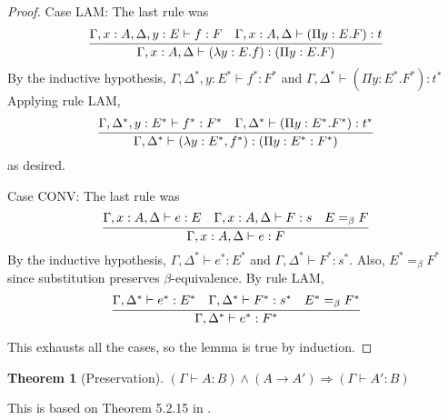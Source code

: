 \documentclass{article}
\newtheorem{theorem}{Theorem}
\begin{document}
\begin{proof}
  Case LAM: The last rule was
  \[\infer{\Gamma,x:A,\Delta\vdash(\lambda y:E.f):(\Pi y:E.F)}{\Gamma,x:A,\Delta,y:E\vdash f:F & \Gamma,x:A,\Delta\vdash(\Pi y:E.F):t}\]
  By the inductive hypothesis, $\Gamma,\Delta^*,y:E^*\vdash f^*:F^*$ and $\Gamma,\Delta^*\vdash(\Pi y:E^*.F^*):t^*$
  Applying rule LAM,
  \[\infer{\Gamma,\Delta^*\vdash(\lambda y:E^*,f^*):(\Pi y:E^*:F^*)}{\Gamma,\Delta^*,y:E^*\vdash f^*:F^* & \Gamma,\Delta^*\vdash(\Pi y:E^*.F^*):t^*}\]
  as desired.

  Case CONV: The last rule was
  \[\infer{\Gamma,x:A,\Delta\vdash e:F}{\Gamma,x:A,\Delta\vdash e:E & \Gamma,x:A,\Delta\vdash F:s & E=_\beta F}\]
  By the inductive hypothesis, $\Gamma,\Delta^*\vdash e^*:E^*$ and $\Gamma,\Delta^*\vdash F^*:s^*$. Also, $E^*=_\beta F^*$ since substitution preserves $\beta$-equivalence. By rule LAM,
  \[\infer{\Gamma,\Delta^*\vdash e^*:F^*}{\Gamma,\Delta^*\vdash e^*:E^* & \Gamma,\Delta^*\vdash F^*:s^* & E^*=_\beta F^*}\]
  
  This exhausts all the cases, so the lemma is true by induction.
\end{proof}


\begin{theorem}[Preservation]
  $(\Gamma\vdash A:B)\wedge(A\rightarrow A')\Rightarrow(\Gamma\vdash A':B)$
\end{theorem}

This is based on Theorem 5.2.15 in \cite{Barendregt92}.
\end{document}
